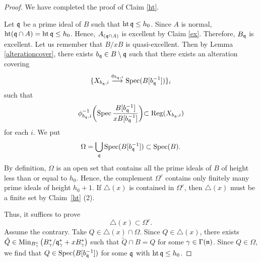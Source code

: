 \documentclass[11pt,a4paper]{amsart}
\theoremstyle{definition}
\theoremstyle{remark}
\newcommand{\Spec}{\operatorname{Spec}}
\newcommand{\Ht}{\operatorname{ht}}
\newcommand{\fq}{\frak{q}}
\newcommand{\fn}{\frak{n}}
\begin{document}
\begin{proof}
We have completed the proof of Claim \ref{ht}.

Let $\fq$ be a prime ideal of $B$ such that $\Ht \fq \le h_0$.
Since $A$ is normal, $\Ht (\fq \cap A) = \Ht \fq \le h_0$.
Hence, $A_{(\fq \cap A)}$ is excellent by Claim \ref{ex}.
Therefore, $B_\fq$ is excellent. Let us remember that $B/xB$ is quasi-excellent. Then by Lemma \ref{alterationcover},
there exists $b_\fq \in B \setminus \fq$ such that there exists an alteration covering
\begin{equation}\label{covering}
\{ X_{b_\fq, i} \stackrel{\phi_{b_\fq, i}}{\longrightarrow} 
{\rm Spec}(B[b_\fq^{-1}]) \}_i
\end{equation}
such that
\begin{equation}\label{regular}
\phi_{b_\fq, i}^{-1}\biggl(\Spec \dfrac{B[b_\fq^{-1}]}{xB[b_\fq^{-1}]}\biggl)
\subset {\rm Reg}(X_{b_\fq, i})
\end{equation}
for each $i$.
We put
\[
\Omega = \bigcup_{\fq} \Spec(B[b_\fq^{-1}])
\subset \Spec(B) .
\]
By definition, $\Omega$ is an open set that contains all the prime ideals of $B$ 
of height less than or equal to $h_0$.
Hence, the complement $\Omega^c$ contains only finitely many prime ideals
of height $h_0 + 1$.
If $\triangle (x)$ is contained in $\Omega^c$, then
$\triangle (x)$ must be a finite set by Claim~\ref{ht} (2).

Thus, it suffices to prove
\[
\triangle (x) \subset \Omega^c .
\]
Assume the contrary.
Take $Q \in \triangle (x) \cap \Omega$.
Since  $Q \in \triangle (x)$, there exists $\tilde{Q} \in  {\rm Min}_{B_\gamma^*}\left( B_\gamma^*/
\fq_\gamma^* + xB_\gamma^* \right)$ such that $\tilde{Q} \cap B = Q$
for some $\gamma \in \Gamma(\fn)$. Since  $Q \in \Omega$, we find that $Q \in \Spec(B[b_\fq^{-1}])$ for some $\fq$ with $\Ht \fq \le h_0$.


\end{proof}
\end{document}

